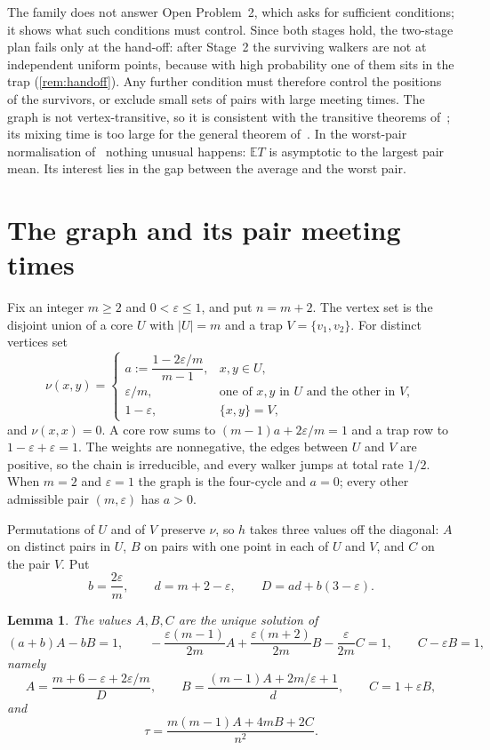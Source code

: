 \documentclass[11pt,a4paper]{article}
\numberwithin{equation}{section}
\newtheorem{lemma}[theorem]{Lemma}
\theoremstyle{remark}
\newcommand{\E}{\mathbb E}
\newcommand{\eps}{\varepsilon}
\begin{document}
The family does not answer Open Problem~2, which asks for sufficient conditions; it shows what such conditions must control. Since both stages hold, the two-stage plan fails only at the hand-off: after Stage~2 the surviving walkers are not at independent uniform points, because with high probability one of them sits in the trap (\cref{rem:handoff}). Any further condition must therefore control the positions of the survivors, or exclude small sets of pairs with large meeting times. The graph is not vertex-transitive, so it is consistent with the transitive theorems of~\cite{Oli13,Her}; its mixing time is too large for the general theorem of~\cite{Oli13}. In the worst-pair normalisation of~\cite{KMS19} nothing unusual happens: $\E T$ is asymptotic to the largest pair mean. Its interest lies in the gap between the average and the worst pair.

\section{The graph and its pair meeting times}\label{sec:graph}

Fix an integer $m\ge2$ and $0<\eps\le1$, and put $n=m+2$. The vertex set is the disjoint union of a core $U$ with $|U|=m$ and a trap $V=\{v_1,v_2\}$. For distinct vertices set
\begin{equation}\label{eq:weights}
\nu(x,y)=
\begin{cases}
a:=\dfrac{1-2\eps/m}{m-1}, & x,y\in U,\\[0.6em]
\eps/m, & \text{one of }x,y\text{ in }U\text{ and the other in }V,\\[0.3em]
1-\eps, & \{x,y\}=V,
\end{cases}
\end{equation}
and $\nu(x,x)=0$. A core row sums to $(m-1)a+2\eps/m=1$ and a trap row to $1-\eps+\eps=1$. The weights are nonnegative, the edges between $U$ and $V$ are positive, so the chain is irreducible, and every walker jumps at total rate $1/2$. When $m=2$ and $\eps=1$ the graph is the four-cycle and $a=0$; every other admissible pair $(m,\eps)$ has $a>0$.

Permutations of $U$ and of $V$ preserve $\nu$, so $h$ takes three values off the diagonal: $A$ on distinct pairs in $U$, $B$ on pairs with one point in each of $U$ and $V$, and $C$ on the pair $V$. Put
\[
b=\frac{2\eps}m,\qquad d=m+2-\eps,\qquad D=ad+b(3-\eps).
\]

\begin{lemma}\label{lem:pairs}
The values $A,B,C$ are the unique solution of
\begin{equation}\label{eq:pairsys}
(a+b)A-bB=1,\qquad -\frac{\eps(m-1)}{2m}A+\frac{\eps(m+2)}{2m}B-\frac{\eps}{2m}C=1,\qquad C-\eps B=1,
\end{equation}
namely
\begin{equation}\label{eq:pairsol}
A=\frac{m+6-\eps+2\eps/m}{D},\qquad B=\frac{(m-1)A+2m/\eps+1}{d},\qquad C=1+\eps B,
\end{equation}
and
\begin{equation}\label{eq:tau}
\tau=\frac{m(m-1)A+4mB+2C}{n^2}.
\end{equation}
\end{lemma}
\end{document}
